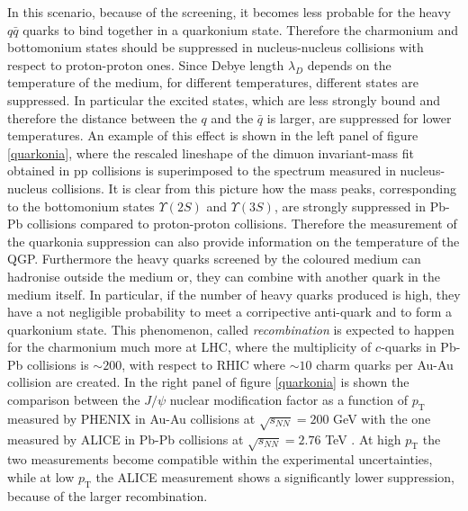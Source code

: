 \documentclass[b5paper,10pt,twoside,oldstyle,classica]{toptesi}
\newcommand{\pt}{p_\text{T}}
\begin{document}
In this scenario, because of the screening, it becomes less probable for the heavy $q\bar{q}$ quarks to bind together in a quarkonium state. Therefore the charmonium and bottomonium states should be suppressed in nucleus-nucleus collisions with respect to proton-proton ones.  Since Debye length $\lambda_D$ depends on the temperature of the medium, for different temperatures, different states are suppressed. In particular the excited states, which are less strongly bound and therefore the distance between the $q$ and the $\bar{q}$ is larger, are suppressed for lower temperatures. An example of this effect is shown in the left panel of figure \ref{quarkonia}, where the rescaled lineshape of the dimuon invariant-mass fit obtained in pp collisions is superimposed to the spectrum measured in nucleus-nucleus collisions. It is clear from this picture how the mass peaks, corresponding to the bottomonium states $\Upsilon(2S)$ and $\Upsilon(3S)$, are strongly suppressed in Pb-Pb collisions compared to proton-proton collisions. Therefore the measurement of the quarkonia suppression can also provide information on the temperature of the QGP. Furthermore the heavy quarks screened by the coloured medium can hadronise outside the medium or, they can combine with another quark in the medium itself. In particular, if the number of heavy quarks produced is high, they have a not negligible probability to meet a corripective anti-quark and to form a quarkonium state. This phenomenon, called \textit{recombination} is expected to happen for the charmonium much more at LHC, where the multiplicity of $c$-quarks in Pb-Pb collisions is $\sim 200$, with respect to RHIC where $\sim 10$ charm quarks per Au-Au collision are created. In the right panel of figure \ref{quarkonia} is shown the comparison between the $J/\psi$ nuclear modification factor as a function of $\pt$ measured by PHENIX in Au-Au collisions at $\sqrt{s_{NN}} = 200$ GeV with the one measured by ALICE in Pb-Pb collisions at $\sqrt{s_{NN}} = 2.76$ TeV \cite{Abelev:2013ila}. At high $\pt$ the two measurements become compatible within the experimental uncertainties, while at low $\pt$ the ALICE measurement shows a significantly lower suppression, because of the larger recombination. 
\end{document}
